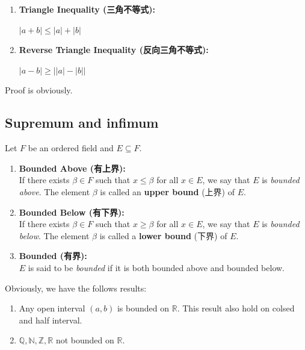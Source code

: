 \documentclass[
	UTF-8,
	11pt, %
	a4paper, %
]{LegrandOrangeBook}
\begin{document}
\begin{proposition}
\begin{enumerate}
        
        \item \textbf{Triangle Inequality (三角不等式):}
        \begin{center}
            $|a + b| \le |a| + |b|$
        \end{center}
        
        \item \textbf{Reverse Triangle Inequality (反向三角不等式):} 
        \begin{center}
            $|a - b| \ge \big| |a| - |b| \big|$ 
        \end{center}
    \end{enumerate}
    \end{proposition}

    Proof is obviously.

    \newpage

    \subsection{Supremum and infimum}

    \begin{definition}
    Let $F$ be an ordered field and $E \subseteq F$.

    \begin{enumerate}
        \item \textbf{Bounded Above (有上界):} \\
        If there exists $\beta \in F$ such that $x \le \beta$ for all $x \in E$, we say that $E$ is \textit{bounded above}. The element $\beta$ is called an \textbf{upper bound} (上界) of $E$.
        
        \item \textbf{Bounded Below (有下界):} \\
        If there exists $\beta \in F$ such that $x \ge \beta$ for all $x \in E$, we say that $E$ is \textit{bounded below}. The element $\beta$ is called a \textbf{lower bound} (下界) of $E$.
        
        \item \textbf{Bounded (有界):} \\
        $E$ is said to be \textit{bounded} if it is both bounded above and bounded below.
    \end{enumerate}
    \end{definition}

    \begin{example}
        Obviously, we have the follows results:
        \begin{enumerate}
            \item Any open interval $(a,b)$ is bounded on $\mathbb{R}$. 
            This result also hold on colsed and half interval.

            \item $\mathbb{Q}, \mathbb{N}, \mathbb{Z},\mathbb{R}$ not bounded on $\mathbb{R}$.
        \end{enumerate}
    \end{example}
\end{document}
